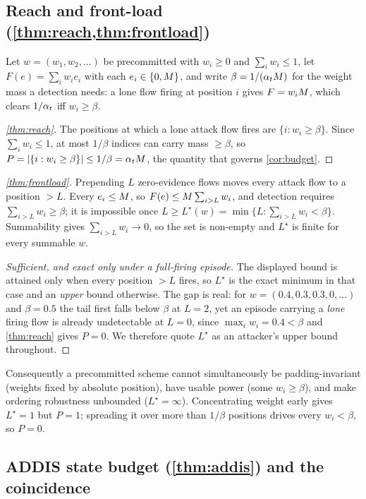 \subsection{Reach and front-load (\cref{thm:reach,thm:frontload})}

Let $w=(w_1,w_2,\dots)$ be precommitted with $w_i\ge0$ and $\sum_i w_i\le1$, let
$F(e)=\sum_i w_i e_i$ with each $e_i\in\{0,M\}$, and write $\beta=1/(\alpha_tM)$ for the
weight mass a detection needs: a lone flow firing at position $i$ gives $F=w_iM$, which clears
$1/\alpha_t$ iff $w_i\ge\beta$.

\begin{proof}[\cref{thm:reach}]
The positions at which a lone attack flow fires are $\{i:w_i\ge\beta\}$. Since $\sum_i w_i\le1$,
at most $1/\beta$ indices can carry mass $\ge\beta$, so
$P=|\{i:w_i\ge\beta\}|\le 1/\beta=\alpha_tM$, the quantity that governs \cref{cor:budget}.
\end{proof}

\begin{proof}[\cref{thm:frontload}]
Prepending $L$ zero-evidence flows moves every attack flow to a position $>L$. Every $e_i\le M$, so
$F(e)\le M\sum_{i>L}w_i$, and detection requires $\sum_{i>L}w_i\ge\beta$; it is impossible once
$L\ge L^\star(w)=\min\{L:\sum_{i>L}w_i<\beta\}$. Summability gives $\sum_{i>L}w_i\to0$, so the set is
non-empty and $L^\star$ is finite for every summable $w$.

\emph{Sufficient, and exact only under a full-firing episode.} The displayed bound is attained only when
every position $>L$ fires, so $L^\star$ is the exact minimum in that case and an \emph{upper} bound
otherwise. The gap is real: for $w=(0.4,0.3,0.3,0,\dots)$ and $\beta=0.5$ the tail first falls below
$\beta$ at $L=2$, yet an episode carrying a \emph{lone} firing flow is already undetectable at $L=0$,
since $\max_i w_i=0.4<\beta$ and \cref{thm:reach} gives $P=0$. We therefore quote $L^\star$ as an
attacker's upper bound throughout.
\end{proof}

Consequently a precommitted scheme cannot simultaneously be padding-invariant (weights fixed by
absolute position), have usable power (some $w_i\ge\beta$), and make ordering robustness unbounded
($L^\star=\infty$). Concentrating weight early gives $L^\star=1$ but $P=1$; spreading it over more
than $1/\beta$ positions drives every $w_i<\beta$, so $P=0$.

\subsection{ADDIS state budget (\cref{thm:addis}) and the coincidence}

